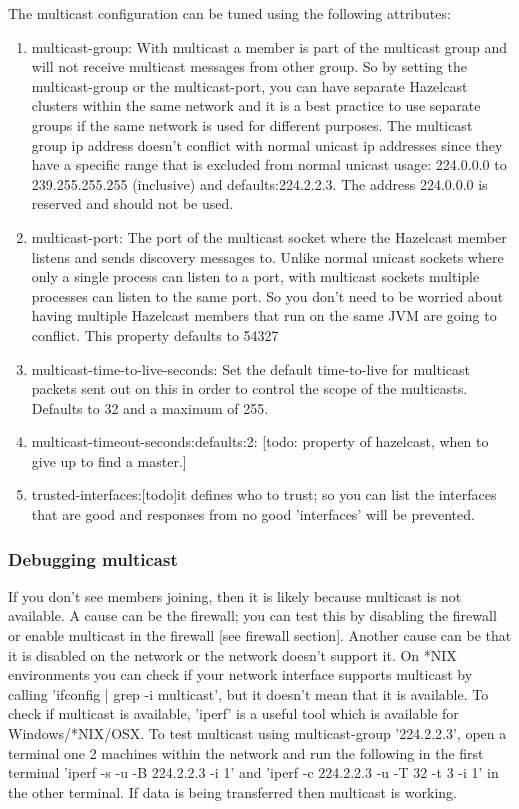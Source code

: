 The multicast configuration can be tuned using the following attributes:
\begin{enumerate}
\item multicast-group: With multicast a member is part of the multicast group and will not receive multicast messages from other group. So by setting the multicast-group or the multicast-port, you can have separate Hazelcast clusters within the same network and it is a best practice to use separate groups if the same network is used for different purposes. The multicast group ip address doesn't conflict with normal unicast ip addresses since they have a specific range that is excluded from normal unicast usage: 224.0.0.0 to 239.255.255.255 (inclusive) and defaults:224.2.2.3. The address 224.0.0.0 is reserved and should not be used.   
\item multicast-port: The port of the multicast socket where the Hazelcast member listens and sends discovery messages to. Unlike normal unicast sockets where only a single process can listen to a port, with multicast sockets multiple processes can listen to the same port. So you don't need to be worried about having multiple Hazelcast members that run on the same JVM are going to conflict. This property defaults to 54327
\item multicast-time-to-live-seconds: Set the default time-to-live for multicast packets sent out on this in order to control the scope of the multicasts. Defaults to 32 and a maximum of 255.
\item multicast-timeout-seconds:defaults:2: [todo: property of hazelcast, when to give up to find a master.]
\item trusted-interfaces:[todo]it defines who to trust; so you can list the interfaces that are good and responses from no good 'interfaces' will be prevented.
\end{enumerate}

\subsubsection{Debugging multicast}
If you don't see members joining, then it is likely because multicast is not available. A cause can be the firewall; you can test this by disabling the firewall or enable multicast in the firewall [see firewall section]. Another cause can be that it is disabled on the network or the network doesn't support it. On *NIX environments you can check if your network interface supports multicast by calling 'ifconfig | grep -i multicast', but it doesn't mean that it is available. To check if multicast is available, 'iperf' is a useful tool which is available for Windows/*NIX/OSX. To test multicast using multicast-group '224.2.2.3', open a terminal one 2 machines within the network and run the following in the first terminal 'iperf -s -u -B 224.2.2.3 -i 1' and 'iperf -c 224.2.2.3 -u -T 32 -t 3 -i 1' in the other terminal. If data is being transferred then multicast is working.

